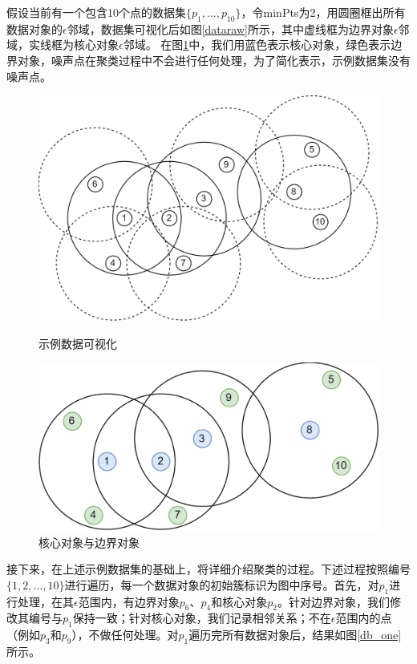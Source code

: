 假设当前有一个包含10个点的数据集$ \{p_1,...,p_{10}\} $，令minPts为2，用圆圈框出所有数据对象的$ \epsilon $邻域，数据集可视化后如图\ref{dataraw}所示，其中虚线框为边界对象$ \epsilon $邻域，实线框为核心对象$ \epsilon $邻域。
在图\ref{dbraw}中，我们用蓝色表示核心对象，绿色表示边界对象，噪声点在聚类过程中不会进行任何处理，为了简化表示，示例数据集没有噪声点。
\begin{figure}[htbp]
	\begin{minipage}[t]{0.48\linewidth}
		\centering
		\includegraphics[width=\linewidth]{img/dbraw.png}
		\caption{示例数据可视化}
		\label{dataraw}
	\end{minipage}
	\hfill
	\begin{minipage}[t]{0.48\linewidth}
		\centering
		\includegraphics[width=\linewidth]{img/db1.png}
		\caption{核心对象与边界对象}
		\label{dbraw}
	\end{minipage}
\end{figure}

接下来，在上述示例数据集的基础上，将详细介绍聚类的过程。下述过程按照编号$ \{1,2,...,10\} $进行遍历，每一个数据对象的初始簇标识为图中序号。首先，对$ p_1 $进行处理，在其$ \epsilon $范围内，有边界对象$ p_6$、$p_4 $和核心对象$ p_2 $。针对边界对象，我们修改其编号与$ p_1 $保持一致；针对核心对象，我们记录相邻关系；不在$ \epsilon $范围内的点（例如$ p_3 $和$ p_9 $），不做任何处理。对$ p_1 $遍历完所有数据对象后，结果如图\ref{db_one}所示。

